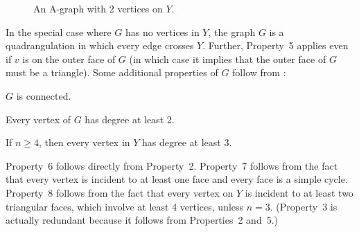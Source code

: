 \begin{figure}
		\caption{An A-graph with 2 vertices on $Y$.}
\end{figure}
	
In the special case where $G$ has no vertices in $Y$, the graph $G$ is a quadrangulation in which every edge crosses $Y$. Further, Property~5 applies even if $v$ is on the outer face of $G$ (in which case it implies that the outer face of $G$ must be a triangle).
Some additional properties of $G$ follow from :
\begin{compactenum}\setcounter{enumi}{5}
	\item $G$ is connected.
	\item Every vertex of $G$ has degree at least 2.   
	\item If $n\ge 4$, then every vertex in $Y$ has degree at least 3. 
\end{compactenum}
Property~6 follows directly from Property~2.
Property~7 follows from the fact that every vertex is incident to at
least one face and every face is a simple cycle.
Property~8 follows from the fact that every vertex on $Y$ is incident
to at least two triangular faces, which involve at least 4 vertices,
unless $n=3$.
(Property~3 is actually redundant because it follows from Properties~2 and~5.)

